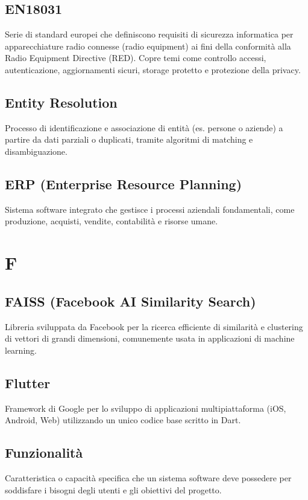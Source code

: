 \documentclass[a4paper,11pt]{article}
\begin{document}
\subsection{EN18031}
Serie di standard europei che definiscono requisiti di sicurezza informatica per apparecchiature radio connesse (radio equipment) ai fini della conformità alla Radio Equipment Directive (RED). Copre temi come controllo accessi, autenticazione, aggiornamenti sicuri, storage protetto e protezione della privacy.

\subsection{Entity Resolution}
Processo di identificazione e associazione di entità (es. persone o aziende) a partire da dati parziali o duplicati, tramite algoritmi di matching e disambiguazione.

\subsection{ERP (Enterprise Resource Planning)}
Sistema software integrato che gestisce i processi aziendali fondamentali, come produzione, acquisti, vendite, contabilità e risorse umane.

\newpage
\section{F}

\subsection{FAISS (Facebook AI Similarity Search)}
Libreria sviluppata da Facebook per la ricerca efficiente di similarità e clustering di vettori di grandi dimensioni, comunemente usata in applicazioni di machine learning.

\subsection{Flutter}
Framework di Google per lo sviluppo di applicazioni multipiattaforma (iOS, Android, Web) utilizzando un unico codice base scritto in Dart.

\subsection{Funzionalità}
Caratteristica o capacità specifica che un sistema software deve possedere per soddisfare i bisogni degli utenti e gli obiettivi del progetto.
\end{document}

